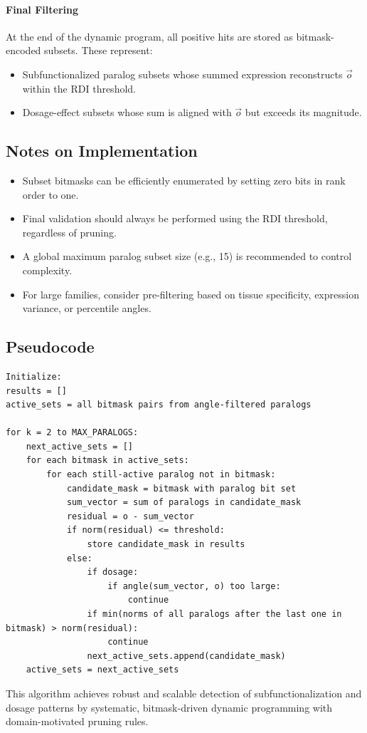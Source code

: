         \paragraph{Final Filtering}
        At the end of the dynamic program, all positive hits are stored as bitmask-encoded subsets. These represent:
        \begin{itemize}
            \item Subfunctionalized paralog subsets whose summed expression reconstructs $\vec{o}$ within the RDI threshold.
            \item Dosage-effect subsets whose sum is aligned with $\vec{o}$ but exceeds its magnitude.
        \end{itemize}

    \subsection{Notes on Implementation}

        \begin{itemize}
            \item Subset bitmasks can be efficiently enumerated by setting zero bits in rank order to one.
            \item Final validation should always be performed using the RDI threshold, regardless of pruning.
            \item A global maximum paralog subset size (e.g., 15) is recommended to control complexity.
            \item For large families, consider pre-filtering based on tissue specificity, expression variance, or percentile angles.
        \end{itemize}

    \subsection{Pseudocode}

        \begin{verbatim}
Initialize:
results = []
active_sets = all bitmask pairs from angle-filtered paralogs

for k = 2 to MAX_PARALOGS:
    next_active_sets = []
    for each bitmask in active_sets:
        for each still-active paralog not in bitmask:
            candidate_mask = bitmask with paralog bit set
            sum_vector = sum of paralogs in candidate_mask
            residual = o - sum_vector
            if norm(residual) <= threshold:
                store candidate_mask in results
            else:
                if dosage:
                    if angle(sum_vector, o) too large:
                        continue
                if min(norms of all paralogs after the last one in bitmask) > norm(residual):
                    continue
                next_active_sets.append(candidate_mask)
    active_sets = next_active_sets
\end{verbatim}

        \noindent
        This algorithm achieves robust and scalable detection of subfunctionalization and dosage patterns by systematic, bitmask-driven dynamic programming with domain-motivated pruning rules.